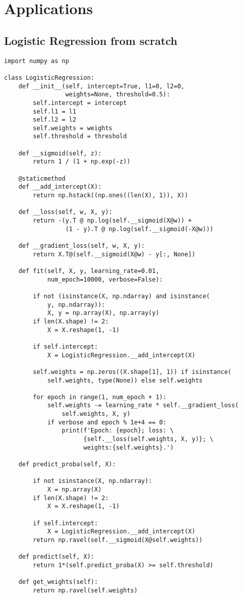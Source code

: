 \documentclass[a4paper, 12pt]{extreport}
\begin{document}

\section{Applications}
\subsection{Logistic Regression from scratch} \label{app_1}
\begin{verbatim}
import numpy as np

class LogisticRegression:
    def __init__(self, intercept=True, l1=0, l2=0,
                 weights=None, threshold=0.5):
        self.intercept = intercept
        self.l1 = l1
        self.l2 = l2
        self.weights = weights
        self.threshold = threshold

    def __sigmoid(self, z):
        return 1 / (1 + np.exp(-z))

    @staticmethod
    def __add_intercept(X):
        return np.hstack((np.ones((len(X), 1)), X))

    def __loss(self, w, X, y):
        return -(y.T @ np.log(self.__sigmoid(X@w)) +
                 (1 - y).T @ np.log(self.__sigmoid(-X@w)))

    def __gradient_loss(self, w, X, y):
        return X.T@(self.__sigmoid(X@w) - y[:, None])

    def fit(self, X, y, learning_rate=0.01,
            num_epoch=10000, verbose=False):

        if not (isinstance(X, np.ndarray) and isinstance(
            y, np.ndarray)):
            X, y = np.array(X), np.array(y)
        if len(X.shape) != 2:
            X = X.reshape(1, -1)

        if self.intercept:
            X = LogisticRegression.__add_intercept(X)

        self.weights = np.zeros((X.shape[1], 1)) if isinstance(
            self.weights, type(None)) else self.weights

        for epoch in range(1, num_epoch + 1):
            self.weights -= learning_rate * self.__gradient_loss(
                self.weights, X, y)
            if verbose and epoch % 1e+4 == 0:
                print(f'Epoch: {epoch}; loss: \
                      {self.__loss(self.weights, X, y)}; \
                      weights:{self.weights}.')

    def predict_proba(self, X):

        if not isinstance(X, np.ndarray):
            X = np.array(X)
        if len(X.shape) != 2:
            X = X.reshape(1, -1)

        if self.intercept:
            X = LogisticRegression.__add_intercept(X)
        return np.ravel(self.__sigmoid(X@self.weights))

    def predict(self, X):
        return 1*(self.predict_proba(X) >= self.threshold)

    def get_weights(self):
        return np.ravel(self.weights)
\end{verbatim}
\end{document}
